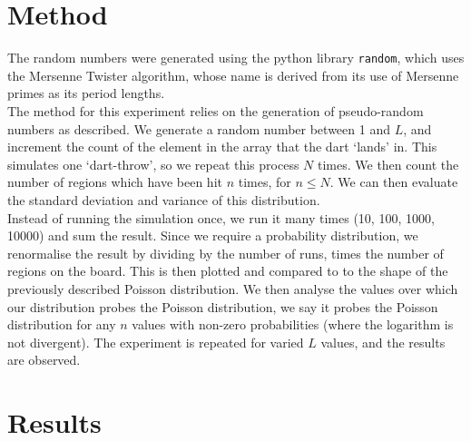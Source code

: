 \documentclass{article}
\theoremstyle{definition}
\theoremstyle{remark}
\begin{document}
\section{Method}
The random numbers were generated using the python library \texttt{random}, which uses the Mersenne Twister algorithm, whose name is derived from its use of Mersenne primes as its period lengths.\\
\indent The method for this experiment relies on the generation of pseudo-random numbers as described. We generate a random number between 1 and $L$, and increment the count of the element in the array that the dart `lands' in. This simulates one `dart-throw', so we repeat this process $N$ times. We then count the number of regions which have been hit $n$ times, for $n\leq N$. We can then evaluate the standard deviation and variance of this distribution. \\
\indent Instead of running the simulation once, we run it many times (10, 100, 1000, 10000) and sum the result. Since we require a probability distribution, we renormalise the result by dividing by the number of runs, times the number of regions on the board. This is then plotted and compared to to the shape of the previously described Poisson distribution. We then analyse the values over which our distribution probes the Poisson distribution, we say it probes the Poisson distribution for any $n$ values with non-zero probabilities (where the logarithm is not divergent). The experiment is repeated for varied $L$ values, and the results are observed.\\

\section{Results}
\end{document}
